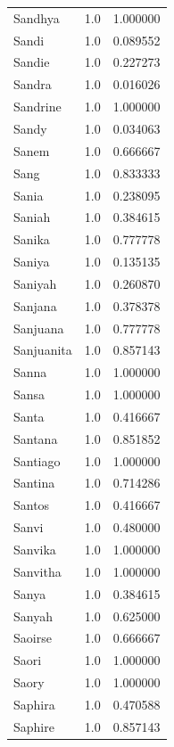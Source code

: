 \documentclass[
  letterpaper,
  DIV=11,
  numbers=noendperiod]{scrreprt}
\begin{document}
\begin{tabular}{lrr}
Sandhya         &   1.0 &   1.000000 \\
Sandi           &   1.0 &   0.089552 \\
Sandie          &   1.0 &   0.227273 \\
Sandra          &   1.0 &   0.016026 \\
Sandrine        &   1.0 &   1.000000 \\
Sandy           &   1.0 &   0.034063 \\
Sanem           &   1.0 &   0.666667 \\
Sang            &   1.0 &   0.833333 \\
Sania           &   1.0 &   0.238095 \\
Saniah          &   1.0 &   0.384615 \\
Sanika          &   1.0 &   0.777778 \\
Saniya          &   1.0 &   0.135135 \\
Saniyah         &   1.0 &   0.260870 \\
Sanjana         &   1.0 &   0.378378 \\
Sanjuana        &   1.0 &   0.777778 \\
Sanjuanita      &   1.0 &   0.857143 \\
Sanna           &   1.0 &   1.000000 \\
Sansa           &   1.0 &   1.000000 \\
Santa           &   1.0 &   0.416667 \\
Santana         &   1.0 &   0.851852 \\
Santiago        &   1.0 &   1.000000 \\
Santina         &   1.0 &   0.714286 \\
Santos          &   1.0 &   0.416667 \\
Sanvi           &   1.0 &   0.480000 \\
Sanvika         &   1.0 &   1.000000 \\
Sanvitha        &   1.0 &   1.000000 \\
Sanya           &   1.0 &   0.384615 \\
Sanyah          &   1.0 &   0.625000 \\
Saoirse         &   1.0 &   0.666667 \\
Saori           &   1.0 &   1.000000 \\
Saory           &   1.0 &   1.000000 \\
Saphira         &   1.0 &   0.470588 \\
Saphire         &   1.0 &   0.857143 \\

\end{tabular}
\end{document}
